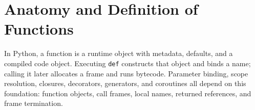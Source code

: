\section{Anatomy and Definition of Functions}

In Python, a function is a runtime object with metadata, defaults, and a compiled code object. Executing \texttt{def} constructs that object and binds a name; calling it later allocates a frame and runs bytecode. Parameter binding, scope resolution, closures, decorators, generators, and coroutines all depend on this foundation: function objects, call frames, local names, returned references, and frame termination.
